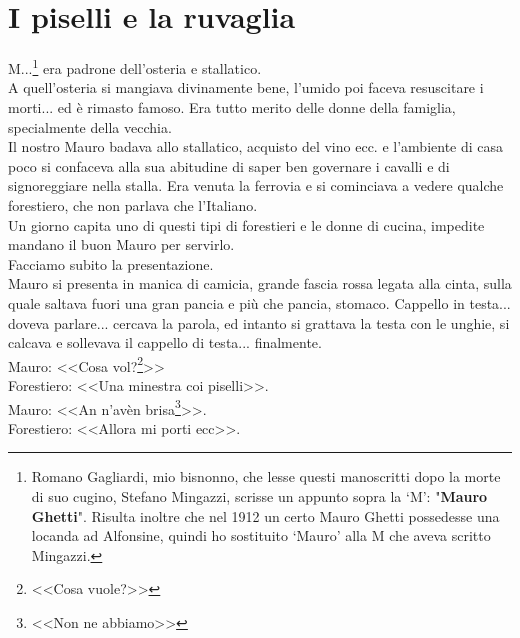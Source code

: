 
\chapter{I piselli e la ruvaglia}
M\:.\:.\:.\footnote{Romano Gagliardi, mio bisnonno, che lesse questi manoscritti dopo la morte di suo cugino, Stefano Mingazzi, scrisse un appunto sopra la `M': "\textbf{Mauro Ghetti}". Risulta inoltre che nel 1912 un certo Mauro Ghetti possedesse una locanda ad Alfonsine, quindi ho sostituito `Mauro' alla M che aveva scritto Mingazzi.} era padrone dell'osteria e stallatico.\\
\indent A quell'osteria si mangiava divinamente bene, l'umido poi faceva resuscitare i morti... ed è rimasto famoso. Era tutto merito delle donne della famiglia, specialmente della vecchia.\\
\indent Il nostro Mauro badava allo stallatico, acquisto del vino ecc. e l'ambiente di casa poco si confaceva alla sua abitudine di saper ben governare i cavalli e di signoreggiare nella stalla. Era venuta la ferrovia e si cominciava a vedere qualche forestiero, che non parlava che l'Italiano.\\
\indent Un giorno capita uno di questi tipi di forestieri e le donne di cucina, impedite mandano il buon Mauro per servirlo.\\
\indent Facciamo subito la presentazione.\\
\indent Mauro si presenta in manica di camicia, grande fascia rossa legata alla cinta, sulla quale saltava fuori una gran pancia e più che pancia, stomaco. Cappello in testa... doveva parlare... cercava la parola, ed intanto si grattava la testa con le unghie, si calcava e sollevava il cappello di testa... finalmente. \\
\indent Mauro: <<Cosa vol?\footnote{<<Cosa vuole?>>}>>\\
\indent Forestiero: <<Una minestra coi piselli>>.\\
\indent Mauro: <<An n'avèn brisa\footnote{<<Non ne abbiamo>>}>>.\\
\indent Forestiero: <<Allora mi porti ecc>>.\\
